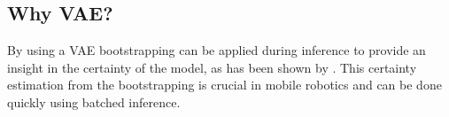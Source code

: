 \subsection*{Why VAE?}
By using a VAE bootstrapping can be applied during inference to provide an insight in the certainty of the model, as has been shown by \cite{kohl2018probabilistic}. This certainty estimation from the bootstrapping is crucial in mobile robotics and can be done quickly using batched inference.
